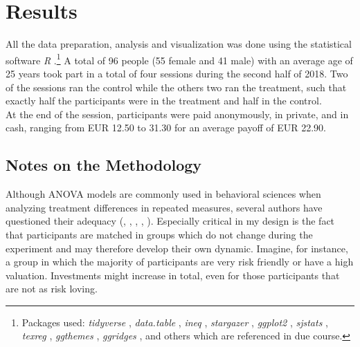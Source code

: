 \chapter{Results}
\label{ch:results}
\thispagestyle{fancy}

All the data preparation, analysis and visualization was done using the statistical software \textit{R} \citep{rcoreteam2014}.\footnote{Packages used: \textit{tidyverse} \citep{wickham2017b}, \textit{data.table} \citep{dowle2018}, \textit{ineq} \citep{zeileis2014}, \textit{stargazer} \citep{hlavac2018}, \textit{ggplot2} \citep{wickham2016}, \textit{sjstats} \citep{ludecke2018}, \textit{texreg} \citep{leifeld2013}, \textit{ggthemes} \citep{arnold2018}, \textit{ggridges} \citep{wilke2018}, and others which are referenced in due course.} A total of 96 people (55 female and 41 male) with an average age of 25 years took part in a total of four sessions during the second half of 2018. Two of the sessions ran the control while the others two ran the treatment, such that exactly half the participants were in the treatment and half in the control.\\

At the end of the session, participants were paid anonymously, in private, and in cash, ranging from EUR 12.50 to 31.30 for an average payoff of EUR 22.90.\\  %

\section{Notes on the Methodology}

Although ANOVA models are commonly used in behavioral sciences when analyzing treatment differences in repeated measures, several authors have questioned their adequacy (\cite{camilli1987}, \cite{vasey1987}, \cite{jaeger2008}, \cite{locker2007}, \cite{krueger2004}). Especially critical in my design is the fact that participants are matched in groups which do not change during the experiment and may therefore develop their own dynamic. Imagine, for instance, a group in which the majority of participants are very risk friendly or have a high valuation. Investments might increase in total, even for those participants that are not as risk loving.\\ 
    
